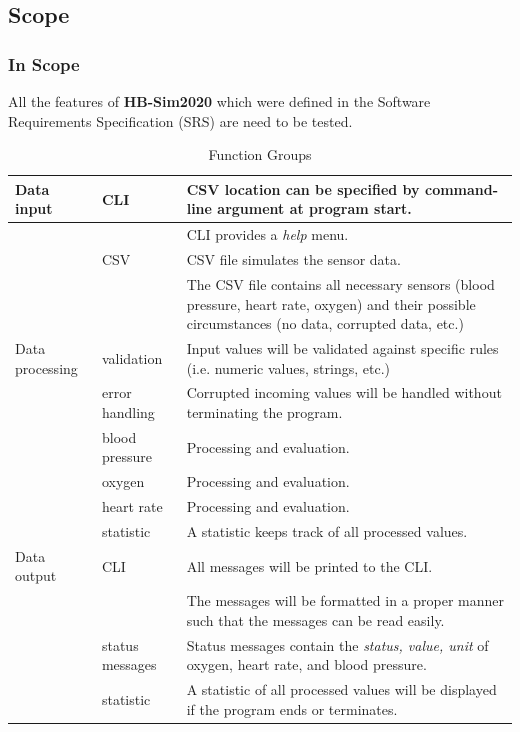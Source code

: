 \documentclass[a4paper]{article}
\newcommand{\arraystrechlength}{1.5}
\begin{document}
\clearpage
\subsection{Scope}
\subsubsection{In Scope}
All the features of \textbf{HB-Sim2020} which were defined in the Software Requirements Specification (SRS) are need to be tested.

\begin{table}[H]
{\renewcommand{\arraystretch}{\arraystrechlength}
\begin{tabular}{ | >{\columncolor{vu-blue}\color{vu-white}}m{70pt} | >{\columncolor{vu-grey-50}}m{80pt} | p{238pt} | } 
\hline
Data input              & CLI & CSV location can be specified by command-line argument at program start.  \\ 
\hline
                        &    & CLI provides a \textit{help} menu. \\ 
\hline
                        &  CSV  & CSV file simulates the sensor data. \\ 
\hline                          
                        &    & The CSV file contains all necessary sensors (blood pressure, heart rate, oxygen) and their possible circumstances (no data, corrupted data, etc.) \\ 
\hline
Data processing         & validation & Input values will be validated against specific rules (i.e. numeric values, strings, etc.)  \\ 
\hline
                        & error handling   & Corrupted incoming values will be handled without terminating the program. \\ 
\hline
                        & blood pressure   & Processing and evaluation. \\ 
\hline
                        & oxygen   & Processing and evaluation. \\ 
\hline
                        & heart rate   & Processing and evaluation. \\ 
\hline
                        & statistic   & A statistic keeps track of all processed values. \\ 
\hline
Data output             & CLI & All messages will be printed to the CLI.  \\ 
\hline
                        &    & The messages will be formatted in a proper manner such that the messages can be read easily.  \\ 
\hline
                        & status messages & Status messages contain the \textit{status, value, unit} of oxygen, heart rate, and blood pressure.  \\ 
\hline                         
                        &  statistic  & A statistic of all processed values will be displayed if the program ends or terminates.  \\ 
\hline
\end{tabular}
}
\caption{Function Groups}
\label{table:func-groups}
\end{table}
\end{document}
